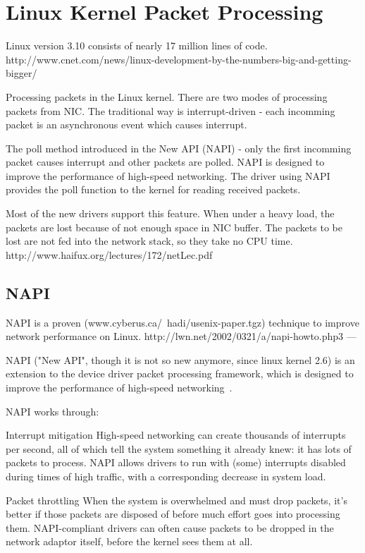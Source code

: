 
\chapter{Linux Kernel Packet Processing}

Linux version 3.10 consists of nearly 17 million lines of code.
http://www.cnet.com/news/linux-development-by-the-numbers-big-and-getting-bigger/

Processing packets in the Linux kernel.
There are two modes of processing packets from NIC.
The traditional way is interrupt-driven - each incomming packet is an
asynchronous event which causes interrupt.

The poll method introduced in the New API (NAPI) - only the first incomming packet causes interrupt
and other packets are polled.
NAPI is designed to improve the performance of high-speed networking.
The driver using NAPI provides the poll function to the kernel for reading received packets.

Most of the new drivers support this feature.
When under a heavy load, the packets are lost because of not enough space in NIC buffer.
The packets to be lost are not fed into the network stack, so they take no CPU time.
http://www.haifux.org/lectures/172/netLec.pdf


\section{NAPI}

NAPI is a proven (www.cyberus.ca/~hadi/usenix-paper.tgz) technique
to improve network performance on Linux.
http://lwn.net/2002/0321/a/napi-howto.php3
---

NAPI ("New API", though it is not so new anymore, since linux kernel 2.6) is an extension to the device driver packet processing framework, which is designed to improve the performance of high-speed networking~\cite{linux-foundation-napi}.

NAPI works through:

Interrupt mitigation 
    High-speed networking can create thousands of interrupts per second, all of which tell the system something it already knew: it has lots of packets to process. NAPI allows drivers to run with (some) interrupts disabled during times of high traffic, with a corresponding decrease in system load.

Packet throttling 
    When the system is overwhelmed and must drop packets, it's better if those packets are disposed of before much effort goes into processing them. NAPI-compliant drivers can often cause packets to be dropped in the network adaptor itself, before the kernel sees them at all.

